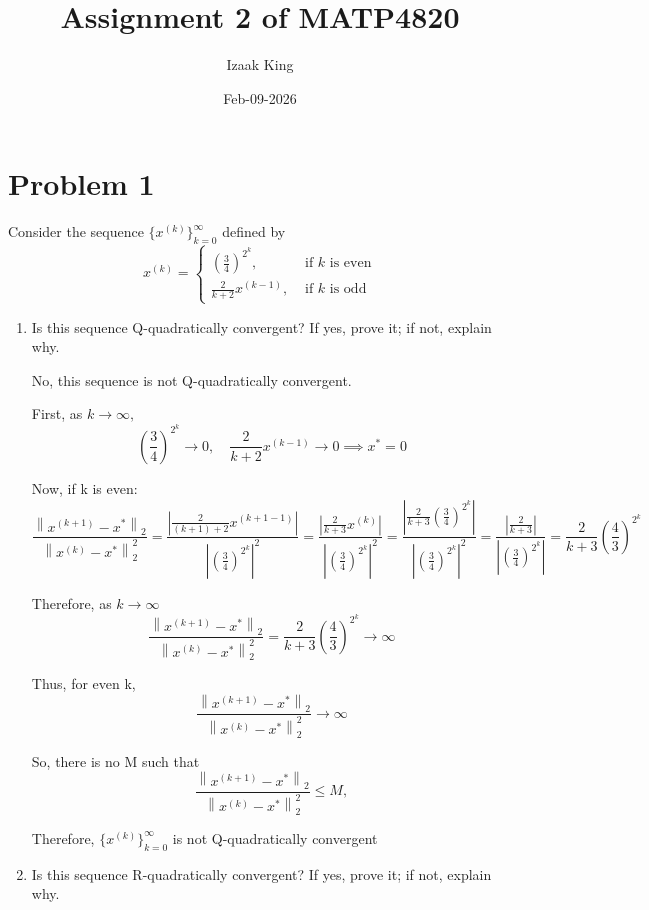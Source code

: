 \documentclass[12pt]{article}
\title{Assignment 2 of \bf{MATP4820}}
\author{Izaak King}
\date{Feb-09-2026}
\begin{document}
\maketitle

\section*{Problem 1}
Consider the sequence $\{x^{(k)}\}_{k=0}^\infty$ defined by
$$x^{(k)}=\left\{\begin{array}{ll}
(\frac{3}{4})^{2^k}, & \text{ if }k\text{ is even}\\[0.1cm]
\frac{2}{k+2}x^{(k-1)}, & \text{ if }k\text{ is odd}
\end{array}\right.$$
\begin{enumerate}
\item
Is this sequence Q-quadratically convergent? If yes, prove it; if not, explain why. 

\vspace{8mm}

No, this sequence is not Q-quadratically convergent. 

First, as $k \rightarrow \infty,$ \[\left(\frac{3}{4}\right)^{2^k} \rightarrow 0, \quad\frac{2}{k+2}x^{(k-1)} \rightarrow 0 \implies x^* = 0\]

Now, if k is even:
\[ \frac{\left\|x^{(k + 1)} - x^* \right\|_2}{\left\|x^{(k)} - x^* \right\|^2_2} = \frac{\left| \frac{2}{(k + 1) + 2}x^{(k + 1 - 1)}\right|}{\left|(\frac{3}{4})^{2^k}\right|^2} = \frac{\left| \frac{2}{k + 3}x^{(k)}\right|}{\left| (\frac{3}{4})^{2^k}\right|^2} = \frac{\left|\frac{2}{k + 3}(\frac{3}{4})^{2^k}\right|}{\left|(\frac{3}{4})^{2^k}\right|^2} = \frac{\left|\frac{2}{k + 3}\right|}{\left|(\frac{3}{4})^{2^k}\right|} = \frac{2}{k + 3}\left(\frac{4}{3}\right)^{2^k}\]

Therefore, as $k \rightarrow \infty$ \[ \frac{\left\|x^{(k + 1)} - x^* \right\|_2}{\left\|x^{(k)} - x^* \right\|^2_2} = \frac{2}{k + 3}\left(\frac{4}{3}\right)^{2^k} \rightarrow \infty\]

Thus, for even k, \[\frac{\left\|x^{(k + 1)} - x^* \right\|_2}{\left\|x^{(k)} - x^* \right\|^2_2} \rightarrow \infty\]

So, there is no M such that \[\frac{\left\|x^{(k + 1)} - x^* \right\|_2}{\left\|x^{(k)} - x^* \right\|^2_2} \leq M,\]

Therefore, $\{x^{(k)}\}_{k=0}^\infty$ is not Q-quadratically convergent

\newpage

\item Is this sequence R-quadratically convergent? If yes, prove it; if not, explain why.
\end{enumerate}
\end{document}
